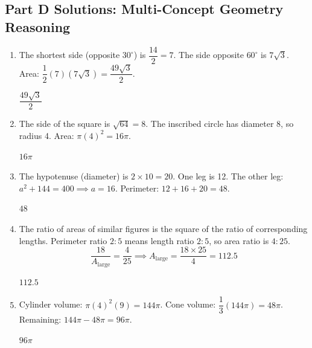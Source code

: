 \documentclass[14pt]{extarticle}
\begin{document}
\subsection*{Part D Solutions: Multi-Concept Geometry Reasoning}
\begin{enumerate}
  \item The shortest side (opposite \(30^\circ\)) is \(\dfrac{14}{2} = 7\). The side opposite \(60^\circ\) is \(7\sqrt{3}\). Area: \(\dfrac{1}{2}(7)(7\sqrt{3}) = \dfrac{49\sqrt{3}}{2}\).

  \(\boxed{\dfrac{49\sqrt{3}}{2}}\)

  \item The side of the square is \(\sqrt{64} = 8\). The inscribed circle has diameter 8, so radius 4. Area: \(\pi(4)^2 = 16\pi\).

  \(\boxed{16\pi}\)

  \item The hypotenuse (diameter) is \(2 \times 10 = 20\). One leg is 12. The other leg: \(a^2 + 144 = 400 \implies a = 16\). Perimeter: \(12 + 16 + 20 = 48\).

  \(\boxed{48}\)

  \item The ratio of areas of similar figures is the square of the ratio of corresponding lengths. Perimeter ratio \(2:5\) means length ratio \(2:5\), so area ratio is \(4:25\).
  \[
  \frac{18}{A_{\text{large}}} = \frac{4}{25} \implies A_{\text{large}} = \frac{18 \times 25}{4} = 112.5
  \]

  \(\boxed{112.5}\)

  \item Cylinder volume: \(\pi(4)^2(9) = 144\pi\). Cone volume: \(\dfrac{1}{3}(144\pi) = 48\pi\). Remaining: \(144\pi - 48\pi = 96\pi\).

  \(\boxed{96\pi}\)
\end{enumerate}
\end{document}
